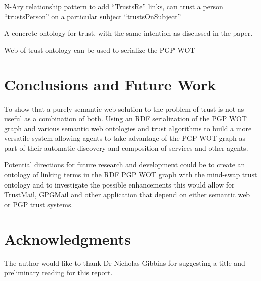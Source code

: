 \documentclass{acm_proc_article-sp}
\begin{document}
N-Ary relationship pattern to add ``TrustsRe'' links, can trust a person ``trustsPerson'' on a particular subject ``trustsOnSubject''

A concrete ontology for trust, with the same intention as discussed in the paper.
\cite{jennifer_golbeck_trust_2013}

Web of trust ontology can be used to serialize the PGP WOT
\cite{_web_2004}

\section{Conclusions and Future Work}

To show that a purely semantic web solution to the problem of trust is not as useful as a combination of both.  Using an RDF serialization of the PGP WOT graph and various semantic web ontologies and trust algorithms to build a more versatile system allowing agents to take advantage of the PGP WOT graph as part of their automatic discovery and composition of services and other agents.

Potential directions for future research and development could be to create an ontology of linking terms in the RDF PGP WOT graph with the mind-swap trust ontology\cite{jennifer_golbeck_trust_2013} and to investigate the possible enhancements this would allow for TrustMail, GPGMail and other application that depend on either semantic web or PGP trust systems.

\section{Acknowledgments}
The author would like to thank Dr Nicholas Gibbins for suggesting a title and preliminary reading for this report.

%


%
%
\end{document}
